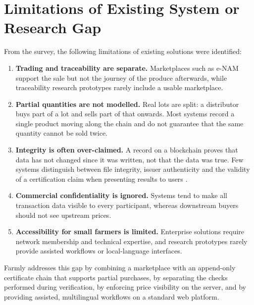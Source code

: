 \section{Limitations of Existing System or Research Gap}
From the survey, the following limitations of existing solutions were identified:
\begin{enumerate}
	\item \textbf{Trading and traceability are separate.} Marketplaces such as e-NAM support the sale but not the journey of the produce afterwards, while traceability research prototypes rarely include a usable marketplace.
	\item \textbf{Partial quantities are not modelled.} Real lots are split: a distributor buys part of a lot and sells part of that onwards. Most systems record a single product moving along the chain and do not guarantee that the same quantity cannot be sold twice.
	\item \textbf{Integrity is often over-claimed.} A record on a blockchain proves that data has not changed since it was written, not that the data was true. Few systems distinguish between file integrity, issuer authenticity and the validity of a certification claim when presenting results to users \cite{galvez2018}.
	\item \textbf{Commercial confidentiality is ignored.} Systems tend to make all transaction data visible to every participant, whereas downstream buyers should not see upstream prices.
	\item \textbf{Accessibility for small farmers is limited.} Enterprise solutions require network membership and technical expertise, and research prototypes rarely provide assisted workflows or local-language interfaces.
\end{enumerate}
Farmly addresses this gap by combining a marketplace with an append-only certificate chain that supports partial purchases, by separating the checks performed during verification, by enforcing price visibility on the server, and by providing assisted, multilingual workflows on a standard web platform.
